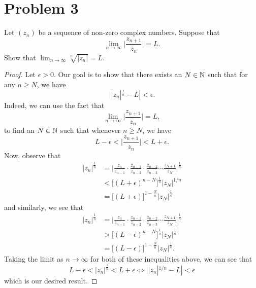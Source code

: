 \documentclass[a4paper]{article}
\begin{document}
\section*{Problem 3}
Let \( ({z}_{n}) \) be a sequence of non-zero complex numbers. Suppose that 
\[  \lim_{ n \to \infty  }  \Big| \frac{ {z}_{n+1}  }{ {z}_{n} }  \Big|  = L. \]
Show that \( \lim_{ n \to \infty  } \sqrt[n]{ | {z}_{n} |   }  = L  \).

\begin{proof}
Let \( \epsilon > 0  \). Our goal is to show that there exists an \( N \in \mathbb{N}  \) such that for any \( n \geq N  \), we have
\[ | | {z}_{n} |^{\frac{ 1 }{ n } } - L  | < \epsilon.  \]
Indeed, we can use the fact that 
\[  \lim_{ n \to \infty  }  \Big| \frac{ {z}_{n+1} }{ {z}_{n} }  \Big|  = L,  \]
to find an \( N \in \mathbb{N}  \) such that whenever \(  n \geq  N \), we have
\[ L - \epsilon  < \Big| \frac{ {z}_{n+1} }{ {z}_{n} }  \Big| < L + \epsilon.  \]
Now, observe that
\begin{align*}
    | {z}_{n} |^{\frac{ 1 }{ n } } &= \Big| \frac{ {z}_{n} }{ {z}_{n-1} } \cdot \frac{ {z}_{n-1} }{ {z}_{n-2} } \cdot \frac{ {z}_{n-2} }{ {z}_{n-3} } \cdots \frac{ {z}_{N+1} }{ {z}_{N} }  \Big|^{\frac{ 1 }{ n } } \\ 
                                   &< \Big[ (L+\epsilon)^{n - N} \Big]^{\frac{ 1 }{ n }} | {z}_{N} |^{1/n} \\
                                   &= \Big[(L+\epsilon)\Big]^{1- \frac{ N }{ n } } | {z}_{N} |^{\frac{ 1 }{ n }}
\end{align*}
and similarly, we see that 
\begin{align*}
    | {z}_{n} |^{\frac{ 1 }{ n } } &= \Big| \frac{ {z}_{n}  }{  {z}_{n-1} }  \cdot \frac{ {z}_{n-1} }{  {z}_{n-2} }  \cdot \frac{ {z}_{n-2}  }{  {z}_{n-3} }  \cdots \frac{ {z}_{N+1} }{ {z}_{N} }  \Big|^{\frac{ 1 }{ n }} \\
                                   &> \Big[ (L - \epsilon)^{n-N} \Big]^{\frac{ 1 }{ n } } | {z}_{N} |^{\frac{ 1 }{ n } } \\
                                   &= \Big[(L - \epsilon)\Big]^{1 - \frac{ N }{ n } } | {z}_{N} |^{\frac{ 1 }{ n } }.
\end{align*}
Taking the limit as \( n \to \infty  \) for both of these inequalities above, we can see that
\[ L - \epsilon < | {z}_{n} |^{\frac{ 1 }{ n }} < L + \epsilon \Longleftrightarrow  | | {z}_{n} |^{1/n} - L | < \epsilon     \]
which is our desired result.

\end{proof}
\end{document}
